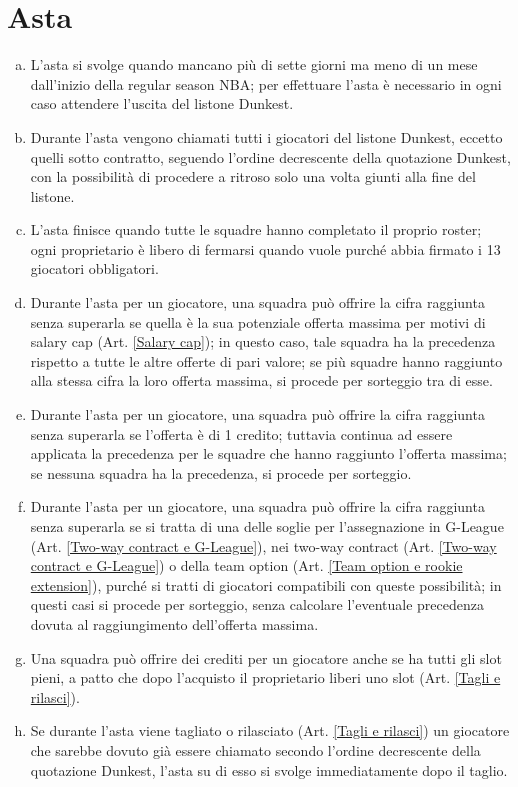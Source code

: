 \documentclass{article}
\begin{document}
\section{Asta}\label{Asta}
\begin{enumerate}[(a)]
\item L'asta si svolge quando mancano più di sette giorni ma meno di un mese dall'inizio della regular season NBA; per effettuare l'asta è necessario in ogni caso attendere l'uscita del listone Dunkest.
\item Durante l'asta vengono chiamati tutti i giocatori del listone Dunkest, eccetto quelli sotto contratto, seguendo l'ordine decrescente della quotazione Dunkest, con la possibilità di procedere a ritroso solo una volta giunti alla fine del listone.
\item L'asta finisce quando tutte le squadre hanno completato il proprio roster; ogni proprietario è libero di fermarsi quando vuole purché abbia firmato i 13 giocatori obbligatori.
\item Durante l'asta per un giocatore, una squadra può offrire la cifra raggiunta senza superarla se quella è la sua potenziale offerta massima per motivi di salary cap (Art. \ref{Salary cap}); in questo caso, tale squadra ha la precedenza rispetto a tutte le altre offerte di pari valore; se più squadre hanno raggiunto alla stessa cifra la loro offerta massima, si procede per sorteggio tra di esse.
\item Durante l'asta per un giocatore, una squadra può offrire la cifra raggiunta senza superarla se l'offerta è di 1 credito; tuttavia continua ad essere applicata la precedenza per le squadre che hanno raggiunto l'offerta massima; se nessuna squadra ha la precedenza, si procede per sorteggio.
\item Durante l'asta per un giocatore, una squadra può offrire la cifra raggiunta senza superarla se si tratta di una delle soglie per l'assegnazione in G-League (Art. \ref{Two-way contract e G-League}), nei two-way contract (Art. \ref{Two-way contract e G-League}) o della team option (Art. \ref{Team option e rookie extension}), purché si tratti di giocatori compatibili con queste possibilità; in questi casi si procede per sorteggio, senza calcolare l'eventuale precedenza dovuta al raggiungimento dell'offerta massima.
\item Una squadra può offrire dei crediti per un giocatore anche se ha tutti gli slot pieni, a patto che dopo l'acquisto il proprietario liberi uno slot (Art. \ref{Tagli e rilasci}).
\item Se durante l'asta viene tagliato o rilasciato (Art. \ref{Tagli e rilasci}) un giocatore che sarebbe dovuto già essere chiamato secondo l'ordine decrescente della quotazione Dunkest, l'asta su di esso si svolge immediatamente dopo il taglio.
\end{enumerate}
\end{document}
